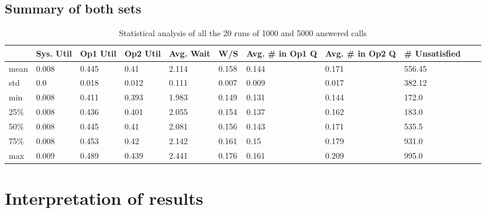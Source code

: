 \documentclass{article}
\begin{document}
\subsection{Summary of both sets}

\begin{table}[H]
    \centering
    \tiny
    \caption{Statistical analysis of all the 20 runs of 1000 and 5000 answered calls}
    \begin{tabular}{@{}lllllllllll@{}}
        \toprule
        \textbf{} & \textbf{Sys. Util} & \textbf{Op1 Util} & \textbf{Op2 Util} & \textbf{Avg. Wait} & \textbf{W/S} & \textbf{Avg. \# in Op1 Q} & \textbf{Avg. \# in Op2 Q} & \textbf{\# Unsatisfied} \\ \midrule
        mean      & 0.008              & 0.445             & 0.41              & 2.114              & 0.158        & 0.144                     & 0.171                     & 556.45                  \\
        std       & 0.0                & 0.018             & 0.012             & 0.111              & 0.007        & 0.009                     & 0.017                     & 382.12                  \\
        min       & 0.008              & 0.411             & 0.393             & 1.983              & 0.149        & 0.131                     & 0.144                     & 172.0                   \\
        25\%      & 0.008              & 0.436             & 0.401             & 2.055              & 0.154        & 0.137                     & 0.162                     & 183.0                   \\
        50\%      & 0.008              & 0.445             & 0.41              & 2.081              & 0.156        & 0.143                     & 0.171                     & 535.5                   \\
        75\%      & 0.008              & 0.453             & 0.42              & 2.142              & 0.161        & 0.15                      & 0.179                     & 931.0                   \\
        max       & 0.009              & 0.489             & 0.439             & 2.441              & 0.176        & 0.161                     & 0.209                     & 995.0                   \\ \bottomrule
    \end{tabular}
\end{table}


\section{Interpretation of results}
\end{document}

